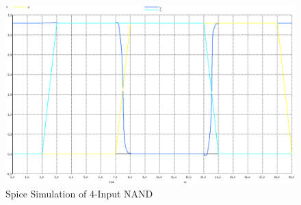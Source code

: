 \documentclass[12pt]{article}
\begin{document}
\begin{figure}[H]
	\centering
	\includegraphics[width=0.70\linewidth, keepaspectratio]{Graphics/4NAND_spice}
	\caption{Spice Simulation of 4-Input NAND}
	\label{fig:spice_4NAND}
\end{figure}
\end{document}
